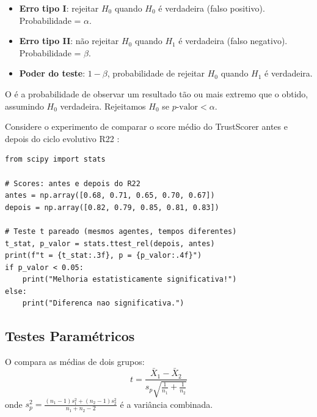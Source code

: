\begin{definicao}
    \begin{itemize}
        \item \textbf{Erro tipo I}: rejeitar $H_0$ quando $H_0$ é verdadeira
              (falso positivo). Probabilidade = $\alpha$.
        \item \textbf{Erro tipo II}: não rejeitar $H_0$ quando $H_1$ é
              verdadeira (falso negativo). Probabilidade = $\beta$.
        \item \textbf{Poder do teste}: $1 - \beta$, probabilidade de rejeitar
              $H_0$ quando $H_1$ é verdadeira.
    \end{itemize}
\end{definicao}

\begin{definicao}[p-valor]
    O  é a probabilidade de observar um resultado tão ou
    mais extremo que o obtido, assumindo $H_0$ verdadeira. Rejeitamos $H_0$
    se $p\text{-valor} < \alpha$.
\end{definicao}

\begin{exemplo}
    Considere o experimento de comparar o score médio do TrustScorer
    antes e depois do ciclo evolutivo R22 \cite{opencode2026ecosystem}:
    \begin{lstlisting}[style=pythonstyle]
from scipy import stats

# Scores: antes e depois do R22
antes = np.array([0.68, 0.71, 0.65, 0.70, 0.67])
depois = np.array([0.82, 0.79, 0.85, 0.81, 0.83])

# Teste t pareado (mesmos agentes, tempos diferentes)
t_stat, p_valor = stats.ttest_rel(depois, antes)
print(f"t = {t_stat:.3f}, p = {p_valor:.4f}")
if p_valor < 0.05:
    print("Melhoria estatisticamente significativa!")
else:
    print("Diferenca nao significativa.")
    \end{lstlisting}
\end{exemplo}

\subsection{Testes Paramétricos}

\begin{definicao}
    O  compara as médias de dois grupos:
    \[
    t = \frac{\bar{X}_1 - \bar{X}_2}{s_p \sqrt{\frac{1}{n_1} + \frac{1}{n_2}}}
    \]
    onde $s_p^2 = \frac{(n_1-1)s_1^2 + (n_2-1)s_2^2}{n_1 + n_2 - 2}$ é a
    variância combinada.
\end{definicao}

